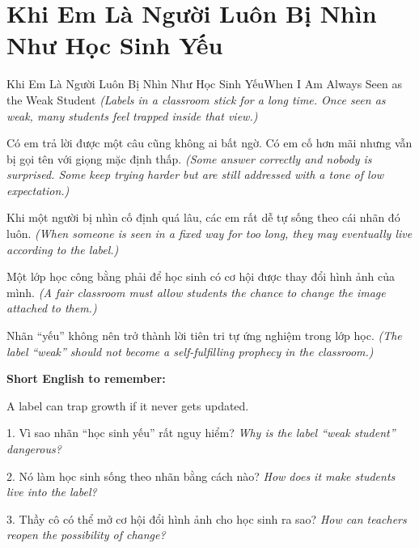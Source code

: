 \section{Khi Em Là Người Luôn Bị Nhìn Như Học Sinh Yếu}
\begin{truyen}{Khi Em Là Người Luôn Bị Nhìn Như Học Sinh Yếu}{When I Am Always Seen as the Weak Student}
\textit{(Labels in a classroom stick for a long time. Once seen as weak, many students feel trapped inside that view.)}

Có em trả lời được một câu cũng không ai bất ngờ. Có em cố hơn mãi nhưng vẫn bị gọi tên với giọng mặc định thấp.
\textit{(Some answer correctly and nobody is surprised. Some keep trying harder but are still addressed with a tone of low expectation.)}

Khi một người bị nhìn cố định quá lâu, các em rất dễ tự sống theo cái nhãn đó luôn.
\textit{(When someone is seen in a fixed way for too long, they may eventually live according to the label.)}

Một lớp học công bằng phải để học sinh có cơ hội được thay đổi hình ảnh của mình.
\textit{(A fair classroom must allow students the chance to change the image attached to them.)}
\end{truyen}

\begin{baihoc}
Nhãn “yếu” không nên trở thành lời tiên tri tự ứng nghiệm trong lớp học.
\textit{(The label “weak” should not become a self-fulfilling prophecy in the classroom.)}
\end{baihoc}

\begin{ghinhoanh}
\textbf{Short English to remember:}

A label can trap growth if it never gets updated.

\end{ghinhoanh}

\begin{tuhocnhanh}
1. Vì sao nhãn “học sinh yếu” rất nguy hiểm? \textit{Why is the label “weak student” dangerous?}

2. Nó làm học sinh sống theo nhãn bằng cách nào? \textit{How does it make students live into the label?}

3. Thầy cô có thể mở cơ hội đổi hình ảnh cho học sinh ra sao? \textit{How can teachers reopen the possibility of change?}
\end{tuhocnhanh}
\ngancach

